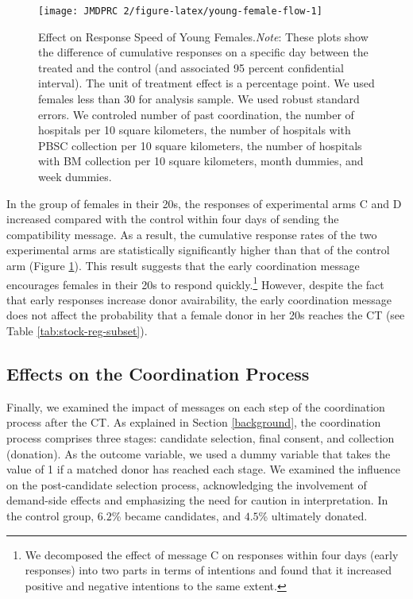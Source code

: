 \documentclass[12pt, a4paper]{article}
\begin{document}
\begin{figure}[t]
\texttt{[image: JMDPRC~2/figure-latex/young-female-flow-1]} \caption{Effect on Response Speed of Young Females.\newline \emph{Note}: These plots show the difference of cumulative responses on a specific day between the treated and the control (and associated 95 percent confidential interval). The unit of treatment effect is a percentage point. We used females less than 30 for analysis sample. We used robust standard errors. We controled number of past coordination, the number of hospitals per 10 square kilometers, the number of hospitals with PBSC collection per 10 square kilometers, the number of hospitals with BM collection per 10 square kilometers, month dummies, and week dummies.}\label{fig:young-female-flow}
\end{figure}

In the group of females in their 20s, the responses of experimental arms C and D increased compared with the control within four days of sending the compatibility message. As a result, the cumulative response rates of the two experimental arms are statistically significantly higher than that of the control arm (Figure \ref{fig:young-female-flow}). This result suggests that the early coordination message encourages females in their 20s to respond quickly.\footnote{We decomposed the effect of message C on responses within four days (early responses) into two parts in terms of intentions and found that it increased positive and negative intentions to the same extent.} However, despite the fact that early responses increase donor avairability, the early coordination message does not affect the probability that a female donor in her 20s reaches the CT (see Table \ref{tab:stock-reg-subset}).

\hypertarget{process}{%
\subsection{Effects on the Coordination Process}\label{process}}

Finally, we examined the impact of messages on each step of the coordination process after the CT. As explained in Section \ref{background}, the coordination process comprises three stages: candidate selection, final consent, and collection (donation). As the outcome variable, we used a dummy variable that takes the value of 1 if a matched donor has reached each stage. We examined the influence on the post-candidate selection process, acknowledging the involvement of demand-side effects and emphasizing the need for caution in interpretation. In the control group, \(6.2\)\% became candidates, and \(4.5\)\% ultimately donated.
\end{document}
